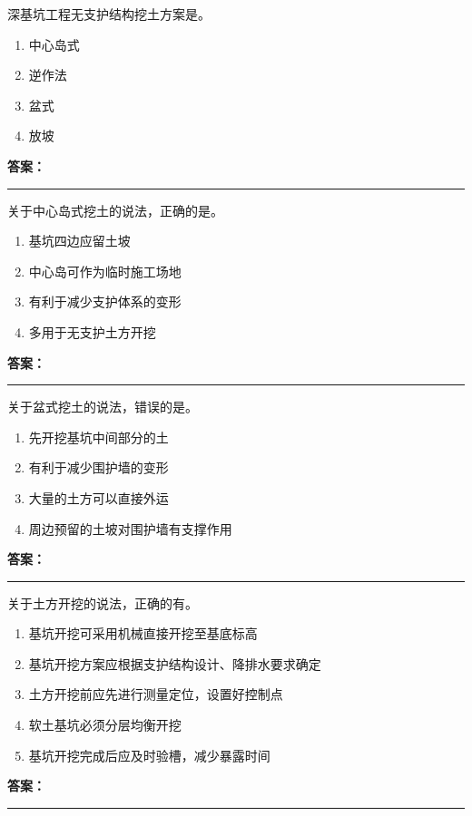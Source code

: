 \documentclass[UTF8,fontset=fandol,11pt]{ctexart}
\newcommand{\answerline}{\textcolor{answerred}{\rule{2.4cm}{0.7pt}}}
\begin{document}
\begin{quizbox}[title={第 11 题}]
深基坑工程无支护结构挖土方案是。\\
\begin{enumerate}[label=\Alph*.]
\item 中心岛式
\item 逆作法
\item 盆式
\item 放坡
\end{enumerate}
\textbf{\textcolor{answerred}{答案：}} \answerline
\end{quizbox}

\begin{quizbox}[title={第 12 题}]
关于中心岛式挖土的说法，正确的是。\\
\begin{enumerate}[label=\Alph*.]
\item 基坑四边应留土坡
\item 中心岛可作为临时施工场地
\item 有利于减少支护体系的变形
\item 多用于无支护土方开挖
\end{enumerate}
\textbf{\textcolor{answerred}{答案：}} \answerline
\end{quizbox}

\begin{quizbox}[title={第 13 题}]
关于盆式挖土的说法，错误的是。\\
\begin{enumerate}[label=\Alph*.]
\item 先开挖基坑中间部分的土
\item 有利于减少围护墙的变形
\item 大量的土方可以直接外运
\item 周边预留的土坡对围护墙有支撑作用
\end{enumerate}
\textbf{\textcolor{answerred}{答案：}} \answerline
\end{quizbox}

\begin{quizbox}[title={第 14 题}]
关于土方开挖的说法，正确的有。\\
\begin{enumerate}[label=\Alph*.]
\item 基坑开挖可采用机械直接开挖至基底标高
\item 基坑开挖方案应根据支护结构设计、降排水要求确定
\item 土方开挖前应先进行测量定位，设置好控制点
\item 软土基坑必须分层均衡开挖
\item 基坑开挖完成后应及时验槽，减少暴露时间
\end{enumerate}
\textbf{\textcolor{answerred}{答案：}} \answerline
\end{quizbox}
\end{document}
